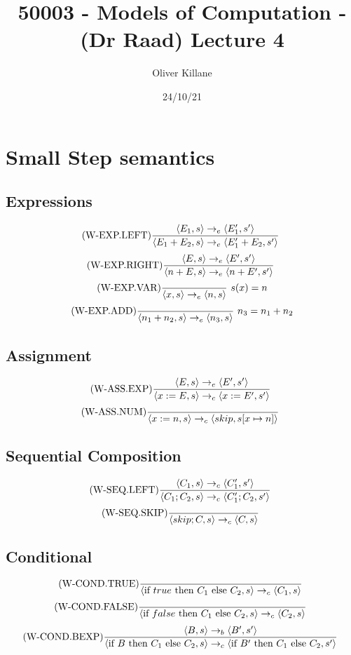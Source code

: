\documentclass{report}
\title{50003 - Models of Computation - (Dr Raad) Lecture 4}
\author{Oliver Killane}
\date{24/10/21}
\begin{document}
    \maketitle

    \section*{Small Step semantics}
        \subsection*{Expressions}
            \[\text{(W-EXP.LEFT)}\dfrac{
                \langle E_1, s \rangle \to_e \langle E_1', s' \rangle
                }{\langle E_1 + E_2, s \rangle \to_e \langle E_1' + E_2, s' \rangle} \ \]
            \[\text{(W-EXP.RIGHT)}\dfrac{
                \langle E, s \rangle \to_e \langle E', s' \rangle
                }{\langle n + E, s \rangle \to_e \langle n + E', s' \rangle} \ \]
            \[\text{(W-EXP.VAR)}\dfrac{}{\langle x, s \rangle \to_e \langle n, s \rangle} \ s(x) = n\]
            \[\text{(W-EXP.ADD)}\dfrac{}{\langle n_1 + n_2, s \rangle \to_e \langle n_3, s \rangle} \ n_3 = n_1 + n_2\]
        \subsection*{Assignment}
            \[\text{(W-ASS.EXP)}\dfrac{\langle E, s \rangle \to_e \langle E', s' \rangle}{
                \langle x := E, s \rangle \to_c \langle x := E', s' \rangle
            } \ \]
            \[\text{(W-ASS.NUM)}\dfrac{}{
                \langle x:= n, s \rangle \to_c \langle skip, s[x \mapsto n] \rangle
            } \ \]
        \subsection*{Sequential Composition}
            \[\text{(W-SEQ.LEFT)}\dfrac{\langle C_1, s \rangle \to_c \langle C_1', s' \rangle}{
                \langle C_1;C_2, s \rangle \to_c \langle C_1';C_2, s' \rangle
            } \ \]
            \[\text{(W-SEQ.SKIP)}\dfrac{}{
                \langle skip;C, s \rangle \to_c \langle C, s \rangle
            } \ \]
        \subsection*{Conditional}
            \[\text{(W-COND.TRUE)}\dfrac{}{\langle \text{if } true \text{ then } C_1 \text{ else } C_2, s \rangle \to_c \langle C_1, s \rangle} \ \]
            \[\text{(W-COND.FALSE)}\dfrac{}{\langle \text{if } false \text{ then } C_1 \text{ else } C_2, s \rangle \to_c \langle C_2, s \rangle} \ \]
            \[\text{(W-COND.BEXP)}\dfrac{
                \langle B, s \rangle \to_b \langle B', s' \rangle
            }{\langle \text{if } B \text{ then } C_1 \text{ else } C_2, s \rangle \to_c \langle \text{if } B' \text{ then } C_1 \text{ else } C_2, s' \rangle} \ \]
\end{document}
